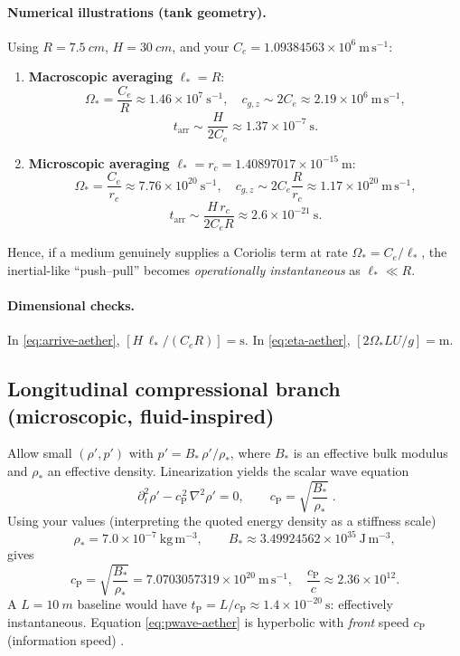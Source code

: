 \documentclass[12pt]{article}
\begin{document}
\paragraph{Numerical illustrations (tank geometry).}
Using $R=\SI{7.5}{cm}$, $H=\SI{30}{cm}$, and your $C_e=1.09384563\times 10^{6}\ \mathrm{m\,s^{-1}}$:
\begin{enumerate}
\item \textbf{Macroscopic averaging} $\ell_*=R$:
\[
\Omega_*=\frac{C_e}{R}\approx 1.46\times 10^{7}\ \mathrm{s^{-1}},\quad
c_{g,z}\sim 2C_e\approx 2.19\times 10^{6}\ \mathrm{m\,s^{-1}},
\]
\[
t_{\mathrm{arr}}\sim \frac{H}{2C_e}\approx 1.37\times 10^{-7}\ \mathrm{s}.
\]
\item \textbf{Microscopic averaging} $\ell_*=r_c=1.40897017\times10^{-15}\ \mathrm{m}$:
\[
\Omega_*=\frac{C_e}{r_c}\approx 7.76\times 10^{20}\ \mathrm{s^{-1}},\quad
c_{g,z}\sim 2C_e\frac{R}{r_c}\approx 1.17\times 10^{20}\ \mathrm{m\,s^{-1}},
\]
\[
t_{\mathrm{arr}}\sim \frac{H\,r_c}{2C_e R}\approx 2.6\times 10^{-21}\ \mathrm{s}.
\]
\end{enumerate}
Hence, if a medium genuinely supplies a Coriolis term at rate $\Omega_*=C_e/\ell_*$, the inertial-like ``push--pull'' becomes \emph{operationally instantaneous} as $\ell_*\!\ll\!R$.

\paragraph{Dimensional checks.}
In \eqref{eq:arrive-aether}, $[H\,\ell_* /(C_e R)]=\mathrm{s}$. In \eqref{eq:eta-aether}, $[2\Omega_* L U/g]=\mathrm{m}$.

\subsection{Longitudinal compressional branch (microscopic, fluid-inspired)}
\label{sec:aether-longitudinal}
Allow small $(\rho',p')$ with $p'=B_*\,\rho'/\rho_*$, where $B_*$ is an effective bulk modulus and $\rho_*$ an effective density. Linearization yields the scalar wave equation \cite{LandauFluids,Lighthill78}
\begin{equation}
\boxed{\;\partial_t^2 \rho' - c_{\mathrm{P}}^{\,2}\,\nabla^2 \rho' = 0,\qquad
c_{\mathrm{P}}=\sqrt{\frac{B_*}{\rho_*}}\;.}
\label{eq:pwave-aether}
\end{equation}
Using your values (interpreting the quoted energy density as a stiffness scale)
\[
\rho_* = 7.0\times 10^{-7}\ \mathrm{kg\,m^{-3}},\qquad
B_* \approx 3.49924562\times 10^{35}\ \mathrm{J\,m^{-3}},
\]
gives
\[
c_{\mathrm{P}}=\sqrt{\frac{B_*}{\rho_*}}
= 7.0703057319\times 10^{20}\ \mathrm{m\,s^{-1}},
\quad
\frac{c_{\mathrm{P}}}{c}\approx 2.36\times 10^{12}.
\]
A $L=\SI{10}{m}$ baseline would have $t_{\mathrm{P}}=L/c_{\mathrm{P}}\approx 1.4\times 10^{-20}\ \mathrm{s}$: effectively instantaneous. Equation \eqref{eq:pwave-aether} is hyperbolic with \emph{front} speed $c_{\mathrm{P}}$ (information speed) \cite{Brillouin1960}.
\end{document}
